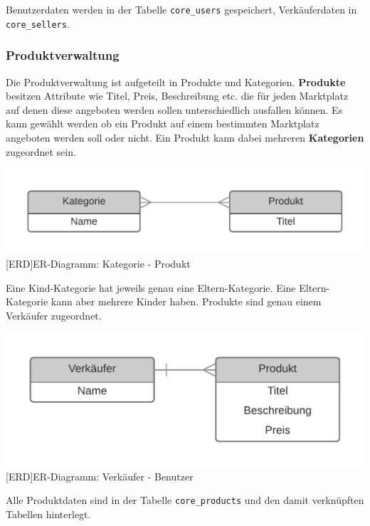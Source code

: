 	Benutzerdaten werden in der Tabelle \texttt{core\_users} gespeichert, Verkäuferdaten in \texttt{core\_sellers}.

	 
	
	\subsubsection{Produktverwaltung}
	
	Die Produktverwaltung ist aufgeteilt in Produkte und Kategorien. \textbf{Produkte} besitzen Attribute wie Titel, Preis, Beschreibung etc. die für jeden Marktplatz auf denen diese angeboten werden sollen unterschiedlich ausfallen können. Es kann gewählt werden ob ein Produkt auf einem bestimmten Marktplatz angeboten werden soll oder nicht. Ein Produkt kann dabei mehreren \textbf{Kategorien} zugeordnet sein.\\
	\begin{minipage}{\linewidth}
		\vspace{1em}
		\centering
		\includegraphics[width=0.6\linewidth]{img/ERD_Category_Product}
		[ERD]{ER-Diagramm: Kategorie - Produkt}
		\label{fig:header}
		\vspace{1em}
	\end{minipage}
	Eine Kind-Kategorie hat jeweils genau eine Eltern-Kategorie. Eine Eltern-Kategorie kann aber mehrere Kinder haben. Produkte sind genau einem Verkäufer zugeordnet. \\
	\begin{minipage}{\linewidth}
		\vspace{1em}
		\centering
		\includegraphics[width=0.6\linewidth]{img/ERD_Seller_Product}
		[ERD]{ER-Diagramm: Verkäufer - Benutzer}
		\label{fig:header}
		\vspace{1em}
	\end{minipage}
	
	Alle Produktdaten sind in der Tabelle \texttt{core\_products} und den damit verknüpften Tabellen hinterlegt.
	
